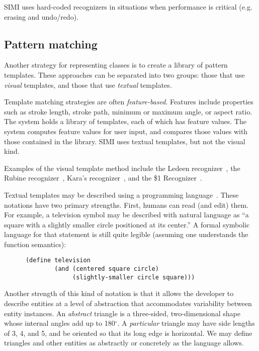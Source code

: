 SIMI uses hard-coded recognizers in situations when performance is
critical (e.g. erasing and undo/redo).

\subsection{Pattern matching}
\label{sec:recognition-library}

Another strategy for representing classes is to create a library of
pattern templates. These approaches can be separated into two groups:
those that use \textit{visual} templates, and those that use
\textit{textual} templates.

Template matching strategies are often
\textit{feature-based}. Features include properties such as stroke
length, stroke path, minimum or maximum angle, or aspect ratio. The
system holds a library of templates, each of which has feature
values. The system computes feature values for user input, and
compares those values with those contained in the library. SIMI uses
textual templates, but not the visual kind.

Examples of the visual template method include the Ledeen
recognizer~\cite{newman-sproull-graphics-2}, the Rubine
recognizer~\cite{rubine-recognizer}, Kara's
recognizer~\cite{kara-recognizer-cg}, and the \$1
Recognizer~\cite{wobbrock-dollar}.

Textual templates may be described using a programming
language~\cite{pasternak-adik,bimber-sketch-bnf,costagliola-xpg,hammond-ladder}. These
notations have two primary strengths. First, humans can read (and
edit) them. For example, a television symbol may be described with
natural language as ``a square with a slightly smaller circle
positioned at its center.'' A formal symbolic language for that
statement is still quite legible (assuming one understands the
function semantics):

\begin{verbatim}
      (define television 
              (and (centered square circle)
                   (slightly-smaller circle square)))
\end{verbatim}

Another strength of this kind of notation is that it allows the
developer to describe entities at a level of abstraction that
accommodates variability between entity
instances. An \textit{abstract} triangle is a three-sided,
two-dimensional shape whose internal angles add up to
180$^\circ$. A \textit{particular} triangle may have side lengths of 3,
4, and 5, and be oriented so that its long edge is horizontal. We may
define triangles and other entities as abstractly or concretely as the
language allows.

